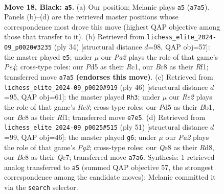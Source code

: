 \documentclass[11pt]{article}
\begin{document}
\begin{figure}[p]\centering
\begin{subfigure}{0.46\textwidth}\centering
\resizebox{\linewidth}{!}{%
\newchessgame
\chessboard[
  setfen={rnb1q1k1/pp2r1pp/8/3pNp1n/8/2B1P1P1/P4PBP/1R1QRK2 b - - 1 18},
  showmover=false,
  pgfstyle=straightmove, color=movearrow, markmove={a7-a5}
]}
\caption{}
\end{subfigure}\hfill
\begin{subfigure}{0.46\textwidth}\centering
\resizebox{\linewidth}{!}{%
\newchessgame
\chessboard[
  setfen={2rq1rk1/p5bp/1p2p1p1/n7/2p1PP2/2P1B3/P2NQ1PP/2R2RK1 w - - 0 18},
  showmover=false,
  pgfstyle=straightmove, color=movearrow, markmove={e4-e5}
]}
\caption{}
\end{subfigure}
\\[4pt]
\begin{subfigure}{0.46\textwidth}\centering
\resizebox{\linewidth}{!}{%
\newchessgame
\chessboard[
  setfen={4rr1k/pp4pp/2b5/3pn3/3N3q/1PR5/P2Q1PPP/1B3RK1 w - - 3 24},
  showmover=false,
  pgfstyle=straightmove, color=movearrow, markmove={c3-h3}
]}
\caption{}
\end{subfigure}\hfill
\begin{subfigure}{0.46\textwidth}\centering
\resizebox{\linewidth}{!}{%
\newchessgame
\chessboard[
  setfen={3r1r1k/p3qppp/1p2b3/3nN3/3PQ3/2PB4/PP4PP/R4RK1 b - - 4 26},
  showmover=false,
  pgfstyle=straightmove, color=movearrow, markmove={g7-g6}
]}
\caption{}
\end{subfigure}
\caption{\textbf{Move 18, Black: \texttt{a5}.} (a) Our position; Melanie plays \texttt{a5} (\texttt{a7a5}). Panels (b)--(d) are the retrieved master positions whose correspondence most drove this move (highest QAP objective among those that transfer to it). (b) Retrieved from \texttt{lichess\_elite\_2024-09\_p0020\#3235} (ply 34) [structural distance $d$=98, QAP obj=57]: the master played \texttt{e5}; under $\mu$ our \emph{Pa2} plays the role of that game's \emph{Pe4}; cross-type roles: our \emph{P}d5 as their \emph{R}c1, our \emph{B}c8 as their \emph{R}f1; transferred move \texttt{a7a5} \textbf{(endorses this move)}. (c) Retrieved from \texttt{lichess\_elite\_2024-09\_p0020\#919} (ply 46) [structural distance $d$=95, QAP obj=61]: the master played \texttt{Rh3}; under $\mu$ our \emph{Re2} plays the role of that game's \emph{Rc3}; cross-type roles: our \emph{P}d5 as their \emph{B}b1, our \emph{B}c8 as their \emph{R}f1; transferred move \texttt{e7e5}. (d) Retrieved from \texttt{lichess\_elite\_2024-09\_p0025\#515} (ply 51) [structural distance $d$=99, QAP obj=46]: the master played \texttt{g6}; under $\mu$ our \emph{Pa2} plays the role of that game's \emph{Pg2}; cross-type roles: our \emph{Q}e8 as their \emph{R}d8, our \emph{B}c8 as their \emph{Q}e7; transferred move \texttt{a7a6}. Synthesis: 1 retrieved analog transferred to \texttt{a5} (summed QAP objective 57, the strongest correspondence among the candidate moves); Melanie committed it via the \texttt{search} selector.}
\label{fig:thought-m35}
\end{figure}
\end{document}
